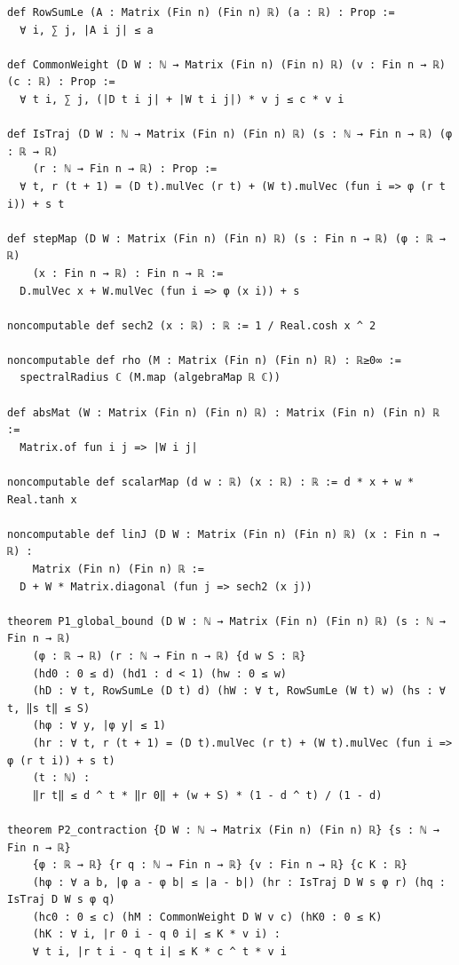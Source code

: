 \begin{Verbatim}[fontsize=\footnotesize,formatcom=\leanfont,commandchars=¦«»]
def RowSumLe (A : Matrix (Fin n) (Fin n) ℝ) (a : ℝ) : Prop :=
  ∀ i, ∑ j, |A i j| ≤ a

def CommonWeight (D W : ℕ → Matrix (Fin n) (Fin n) ℝ) (v : Fin n → ℝ) (c : ℝ) : Prop :=
  ∀ t i, ∑ j, (|D t i j| + |W t i j|) * v j ≤ c * v i

def IsTraj (D W : ℕ → Matrix (Fin n) (Fin n) ℝ) (s : ℕ → Fin n → ℝ) (φ : ℝ → ℝ)
    (r : ℕ → Fin n → ℝ) : Prop :=
  ∀ t, r (t + 1) = (D t).mulVec (r t) + (W t).mulVec (fun i => φ (r t i)) + s t

def stepMap (D W : Matrix (Fin n) (Fin n) ℝ) (s : Fin n → ℝ) (φ : ℝ → ℝ)
    (x : Fin n → ℝ) : Fin n → ℝ :=
  D.mulVec x + W.mulVec (fun i => φ (x i)) + s

noncomputable def sech2 (x : ℝ) : ℝ := 1 / Real.cosh x ^ 2

noncomputable def rho (M : Matrix (Fin n) (Fin n) ℝ) : ℝ≥0∞ :=
  spectralRadius ℂ (M.map (algebraMap ℝ ℂ))

def absMat (W : Matrix (Fin n) (Fin n) ℝ) : Matrix (Fin n) (Fin n) ℝ :=
  Matrix.of fun i j => |W i j|

noncomputable def scalarMap (d w : ℝ) (x : ℝ) : ℝ := d * x + w * Real.tanh x

noncomputable def linJ (D W : Matrix (Fin n) (Fin n) ℝ) (x : Fin n → ℝ) :
    Matrix (Fin n) (Fin n) ℝ :=
  D + W * Matrix.diagonal (fun j => sech2 (x j))

theorem P1_global_bound (D W : ℕ → Matrix (Fin n) (Fin n) ℝ) (s : ℕ → Fin n → ℝ)
    (φ : ℝ → ℝ) (r : ℕ → Fin n → ℝ) {d w S : ℝ}
    (hd0 : 0 ≤ d) (hd1 : d < 1) (hw : 0 ≤ w)
    (hD : ∀ t, RowSumLe (D t) d) (hW : ∀ t, RowSumLe (W t) w) (hs : ∀ t, ‖s t‖ ≤ S)
    (hφ : ∀ y, |φ y| ≤ 1)
    (hr : ∀ t, r (t + 1) = (D t).mulVec (r t) + (W t).mulVec (fun i => φ (r t i)) + s t)
    (t : ℕ) :
    ‖r t‖ ≤ d ^ t * ‖r 0‖ + (w + S) * (1 - d ^ t) / (1 - d)

theorem P2_contraction {D W : ℕ → Matrix (Fin n) (Fin n) ℝ} {s : ℕ → Fin n → ℝ}
    {φ : ℝ → ℝ} {r q : ℕ → Fin n → ℝ} {v : Fin n → ℝ} {c K : ℝ}
    (hφ : ∀ a b, |φ a - φ b| ≤ |a - b|) (hr : IsTraj D W s φ r) (hq : IsTraj D W s φ q)
    (hc0 : 0 ≤ c) (hM : CommonWeight D W v c) (hK0 : 0 ≤ K)
    (hK : ∀ i, |r 0 i - q 0 i| ≤ K * v i) :
    ∀ t i, |r t i - q t i| ≤ K * c ^ t * v i


\end{Verbatim}
